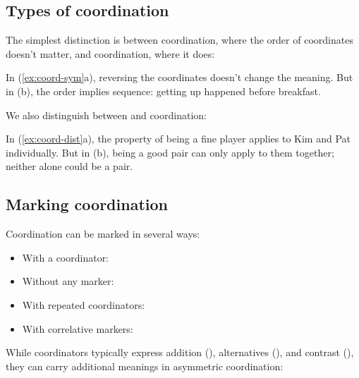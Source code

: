 \subsection{Types of coordination}

The simplest distinction is between  coordination, where the order of coordinates doesn't matter, and  coordination, where it does:

\ea \label{ex:coord-sym}
    \z
\z
In (\ref{ex:coord-sym}a), reversing the coordinates doesn't change the meaning. But in (b), the order implies sequence: getting up happened before breakfast.

We also distinguish between  and  coordination:

\ea \label{ex:coord-dist}
    \z
\z
In (\ref{ex:coord-dist}a), the property of being a fine player applies to Kim and Pat individually. But in (b), being a good pair can only apply to them together; neither alone could be a pair.

\subsection{Marking coordination}

Coordination can be marked in several ways:
\begin{itemize}[noitemsep]
    \item With a coordinator: 
    \item Without any marker: 
    \item With repeated coordinators: 
    \item With correlative markers: 
\end{itemize}

While coordinators typically express addition (), alternatives (), and contrast (), they can carry additional meanings in asymmetric coordination:

\ea \label{ex:coord-meaning}
    \z
\z

